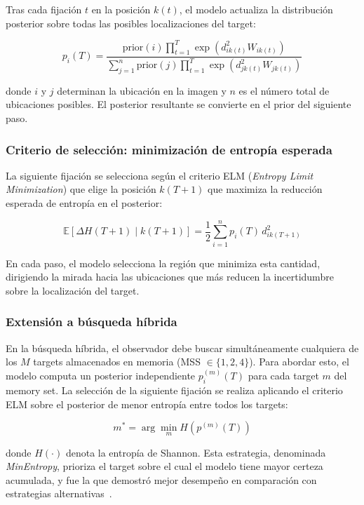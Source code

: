 Tras cada fijación $t$ en la posición $k(t)$, el modelo actualiza 
la distribución posterior sobre todas las posibles localizaciones 
del target:

\begin{equation}
    p_i(T) = \frac{\text{prior}(i) \prod_{t=1}^{T} \exp\left(d^2_{ik(t)} 
    W_{ik(t)}\right)}{\sum_{j=1}^{n} \text{prior}(j) \prod_{t=1}^{T} 
    \exp\left(d^2_{jk(t)} W_{jk(t)}\right)}
    \label{eq:posterior}
\end{equation}

\noindent donde $i$ y $j$ determinan la ubicación en la imagen y $n$ es 
el número total de ubicaciones posibles. El posterior resultante se 
convierte en el prior del siguiente paso.

\subsubsection{Criterio de selección: minimización de entropía esperada}

La siguiente fijación se selecciona según el criterio ELM
(\textit{Entropy Limit Minimization}) que 
elige la posición $k(T+1)$ que maximiza la reducción esperada de 
entropía en el posterior:

\begin{equation}
    \mathbb{E}[\Delta H(T+1) \mid k(T+1)] = \frac{1}{2} \sum_{i=1}^{n} 
    p_i(T)\, d^2_{ik(T+1)}
    \label{eq:elm}
\end{equation}

En cada paso, el modelo selecciona la región que minimiza esta 
cantidad, dirigiendo la mirada hacia las ubicaciones que más reducen 
la incertidumbre sobre la localización del target.

\subsubsection{Extensión a búsqueda híbrida}

En la búsqueda híbrida, el observador debe buscar simultáneamente 
cualquiera de los $M$ targets almacenados en memoria 
(MSS $\in \{1, 2, 4\}$). Para abordar esto, el modelo computa un 
posterior independiente $p_i^{(m)}(T)$ para cada target $m$ del 
memory set. La selección de la siguiente fijación se realiza 
aplicando el criterio ELM sobre el posterior de menor entropía 
entre todos los targets:

\begin{equation}
    m^* = \arg\min_{m} H\left(p^{(m)}(T)\right)
\end{equation}

\noindent donde $H(\cdot)$ denota la entropía de Shannon. Esta 
estrategia, denominada \textit{MinEntropy}, prioriza el target sobre 
el cual el modelo tiene mayor certeza acumulada, y fue la que
demostró mejor desempeño en comparación con estrategias alternativas~\citep{ruarte2025}.
